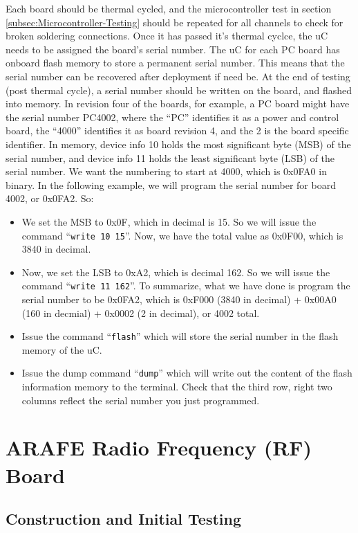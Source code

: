 \documentclass[letter,12pt]{article}
\begin{document}
Each board should be thermal cycled, and the microcontroller test in section \ref{subsec:Microcontroller-Testing} should be repeated for all channels to check for broken soldering connections. Once it has passed it's thermal cyclce, the uC needs to be assigned the board's serial number. The uC for each PC board has onboard flash memory to store a permanent serial number. This means that the serial number can be recovered after deployment if need be. At the end of testing (post thermal cycle), a serial number should be written on the board, and flashed into memory. In revision four of the boards, for example, a PC board might have the serial number PC4002, where the ``PC'' identifies it as a power and control board, the ``4000'' identifies it as board revision 4, and the 2 is the board specific identifier. In memory, device info 10 holds the most significant byte (MSB) of the serial number, and device info 11 holds the least significant byte (LSB) of the serial number. We want the numbering to start at 4000, which is 0x0FA0 in binary. In the following example, we will program the serial number for board 4002, or 0x0FA2. So:

\begin{itemize}
\item We set the MSB to 0x0F, which in decimal is 15. So we will issue the command ``\texttt{write 10 15}''. Now, we have the total value as 0x0F00, which is 3840 in decimal.
\item Now, we set the LSB to 0xA2, which is decimal 162. So we will issue the command ``\texttt{write 11 162}''. To summarize, what we have done is program the serial number to be 0x0FA2, which is 0xF000 (3840 in decimal) + 0x00A0 (160 in decmial) + 0x0002 (2 in decimal), or 4002 total. 
\item Issue the command ``\texttt{flash}'' which will store the serial number in the flash memory of the uC.
\item Issue the dump command ``\texttt{dump}'' which will write out the content of the flash information memory to the terminal. Check that the third row, right two columns reflect the serial number you just programmed.
\end{itemize}

\section{ARAFE Radio Frequency (RF) Board}

\subsection{Construction and Initial Testing}
\end{document}
